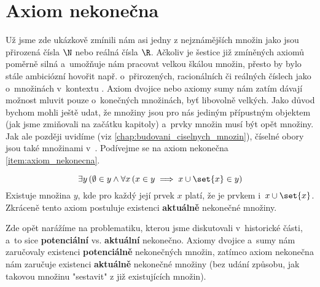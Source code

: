 \section{Axiom nekonečna}\label{sec:axiom_nekonecna}
Už jsme zde ukázkově zmínili nám asi jedny z nejznámějších množin jako jsou přirozená čísla $\N$ nebo reálná čísla $\R$. Ačkoliv je šestice již zmíněných axiomů poměrně silná a~umožňuje nám pracovat velkou škálou množin, přesto by bylo stále ambiciózní hovořit např. o~přirozených, racionálních či reálných číslech jako o~množinách v~kontextu \ZF{}. Axiom dvojice nebo axiomy sumy nám zatím dávají možnost mluvit pouze o~konečných množinách, byť libovolně velkých. Jako důvod bychom mohli ještě udat, že množiny jsou pro nás jediným přípustným objektem (jak jsme zmiňovali na začátku kapitoly) a~prvky množin musí být opět množiny. Jak ale později uvidíme (viz \ref{chap:budovani_ciselnych_mnozin}), číselné obory jsou také množinami v~\ZF{}. Podívejme se na axiom nekonečna \ref{item:axiom_nekonecna}.
\medskip

\begin{equation*}
    \exists y\, (\emptyset\in y \land \forall x\,(x\in y\implies x\cup\set{x}\in y)
\end{equation*}
Existuje množina $y$, kde pro každý její prvek $x$ platí, že je prvkem i~$x\cup\set{x}$. Zkráceně tento axiom postuluje existenci \textbf{aktuálně} nekonečné množiny.\par
Zde opět narážíme na problematiku, kterou jsme diskutovali v~historické části, a~to sice \textbf{potenciální} vs. \textbf{aktuální} nekonečno. Axiomy dvojice a~sumy nám zaručovaly existenci \textbf{potenciálně} nekonečných množin, zatímco axiom nekonečna nám zaručuje existenci \textbf{aktuálně} nekonečné množiny (bez udání způsobu, jak takovou množinu "sestavit" z již existujících množin).\par